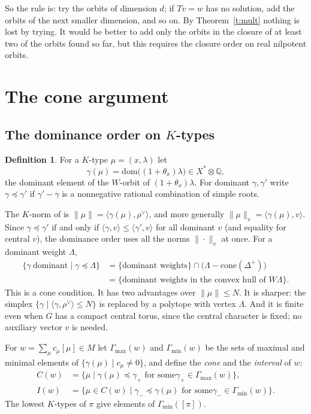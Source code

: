 \documentclass[11pt,leqno]{article}
\theoremstyle{definition}
\newtheorem{definition}[equation]{Definition}
\numberwithin{equation}{section}
\newcommand{\Q}{\mathbb Q}
\newcommand{\ch}[1]{#1^\vee}
\newcommand{\dom}{\mathrm{dom}}
\begin{document}
So the rule is: try the orbits of dimension $d$; if $Tv=w$ has no solution,
add the orbits of the next smaller dimension, and so on.  By
Theorem~\ref{t:mult} nothing is lost by trying.  It would be better to add
only the orbits in the closure of at least two of the orbits found so far,
but this requires the closure order on real nilpotent orbits.

\section{The cone argument}
\label{s:cone}

\subsection{The dominance order on $K$-types}

\begin{definition}
For a $K$-type $\mu=(x,\lambda)$ let
\[
\gamma(\mu)=\dom\big((1+\theta_x)\lambda\big)\in X^*\otimes\Q,
\]
the dominant element of the $W$-orbit of $(1+\theta_x)\lambda$.  For dominant
$\gamma,\gamma'$ write $\gamma\preceq\gamma'$ if $\gamma'-\gamma$ is a
nonnegative rational combination of simple roots.
\end{definition}

The $K$-norm of \cite[Section~8]{KN} is
$\|\mu\|=\langle\gamma(\mu),\ch\rho\rangle$, and more generally
$\|\mu\|_v=\langle\gamma(\mu),v\rangle$.  Since $\gamma\preceq\gamma'$ if and
only if $\langle\gamma,v\rangle\le\langle\gamma',v\rangle$ for all dominant
$v$ (and equality for central $v$), the dominance order uses all the norms
$\|\cdot\|_v$ at once.  For a dominant weight $\Lambda$,
\begin{align*}
\{\gamma\ \text{dominant}\mid\gamma\preceq\Lambda\}
&=\{\text{dominant weights}\}\cap\big(\Lambda-\mathrm{cone}(\Delta^+)\big)\\
&=\{\text{dominant weights in the convex hull of }W\Lambda\}.
\end{align*}
This is a cone condition.  It has two advantages over $\|\mu\|\le N$.  It is
sharper: the simplex $\{\gamma\mid\langle\gamma,\ch\rho\rangle\le N\}$ is
replaced by a polytope with vertex $\Lambda$.  And it is finite even when $G$
has a compact central torus, since the central character is fixed; no
auxiliary vector $v$ is needed.

For $w=\sum_\mu c_\mu[\mu]\in M$ let $\Gamma_{\max}(w)$ and
$\Gamma_{\min}(w)$ be the sets of maximal and minimal elements of
$\{\gamma(\mu)\mid c_\mu\ne 0\}$, and define the \emph{cone} and the
\emph{interval} of $w$:
\begin{align*}
C(w)&=\{\mu\mid\gamma(\mu)\preceq\gamma_+\text{ for some
}\gamma_+\in\Gamma_{\max}(w)\},\\
I(w)&=\{\mu\in C(w)\mid\gamma_-\preceq\gamma(\mu)\text{ for some
}\gamma_-\in\Gamma_{\min}(w)\}.
\end{align*}
The lowest $K$-types of $\pi$ give elements of $\Gamma_{\min}([\pi])$.
\end{document}

